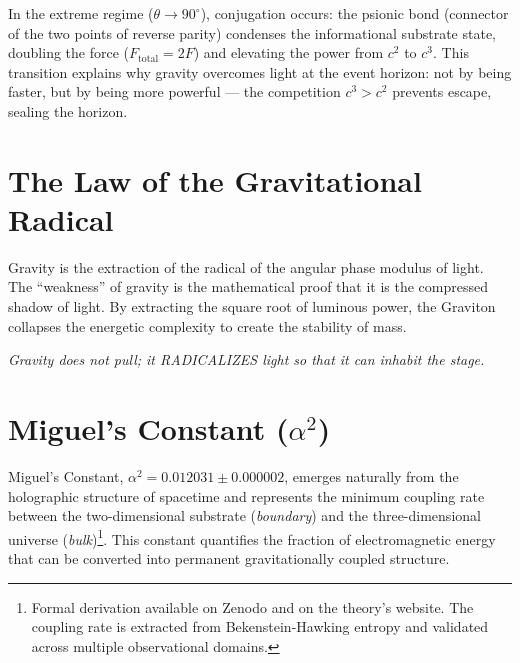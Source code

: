 \documentclass[12pt,a4paper,twoside]{article}
\newcommand{\alphaii}{\alpha^{2}}
\newcommand{\boundary}{\textit{boundary}}
\newcommand{\bulk}{\textit{bulk}}
\begin{document}
In the extreme regime ($\theta \to 90^\circ{}$), conjugation occurs: the psionic bond (connector of the two points of reverse parity) condenses the informational substrate state, doubling the force ($F_{\text{total}} = 2F$) and elevating the power from $c^2$ to $c^3$. This transition explains why gravity overcomes light at the event horizon: not by being faster, but by being more powerful --- the competition $c^3 > c^2$ prevents escape, sealing the horizon.


\section{The Law of the Gravitational Radical}


Gravity is the extraction of the radical of the angular phase modulus of light. The ``weakness'' of gravity is the mathematical proof that it is the compressed shadow of light. By extracting the square root of luminous power, the Graviton collapses the energetic complexity to create the stability of mass.

\medskip
\noindent\textit{Gravity does not pull; it RADICALIZES light so that it can inhabit the stage.}


\section{Miguel's Constant ($\alphaii$)}


Miguel's Constant, $\alphaii = 0.012031 \pm 0.000002$, emerges naturally from the holographic structure of spacetime and represents the minimum coupling rate between the two-dimensional substrate (\boundary) and the three-dimensional universe (\bulk)\footnote{Formal derivation available on Zenodo and on the theory's website. The coupling rate is extracted from Bekenstein-Hawking entropy and validated across multiple observational domains.}. This constant quantifies the fraction of electromagnetic energy that can be converted into permanent gravitationally coupled structure. \cite{Miguel2026Alpha2}
\end{document}
